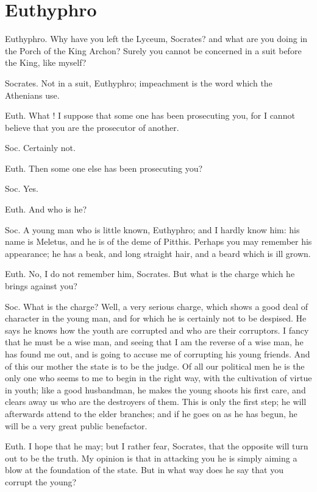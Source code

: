 


\chapter{Euthyphro} %
\label{cha:euthyphro}


Euthyphro. Why have you left the Lyceum, Socrates? and what are you doing in the Porch of the King Archon? Surely you cannot be concerned in a suit before the King, like myself?

Socrates. Not in a suit, Euthyphro; impeachment is the word which the Athenians use.

Euth. What ! I suppose that some one has been prosecuting you, for I cannot believe that you are the prosecutor of another.

Soc. Certainly not.

Euth. Then some one else has been prosecuting you?

Soc. Yes.

Euth. And who is he?

Soc. A young man who is little known, Euthyphro; and I hardly know him: his name is Meletus, and he is of the deme of Pitthis. Perhaps you may remember his appearance; he has a beak, and long straight hair, and a beard which is ill grown.

Euth. No, I do not remember him, Socrates. But what is the charge which he brings against you?

Soc. What is the charge? Well, a very serious charge, which shows a good deal of character in the young man, and for which he is certainly not to be despised. He says he knows how the youth are corrupted and who are their corruptors. I fancy that he must be a wise man, and seeing that I am the reverse of a wise man, he has found me out, and is going to accuse me of corrupting his young friends. And of this our mother the state is to be the judge. Of all our political men he is the only one who seems to me to begin in the right way, with the cultivation of virtue in youth; like a good husbandman, he makes the young shoots his first care, and clears away us who are the destroyers of them. This is only the first step; he will afterwards attend to the elder branches; and if he goes on as he has begun, he will be a very great public benefactor.

Euth. I hope that he may; but I rather fear, Socrates, that the opposite will turn out to be the truth. My opinion is that in attacking you he is simply aiming a blow at the foundation of the state. But in what way does he say that you corrupt the young?

